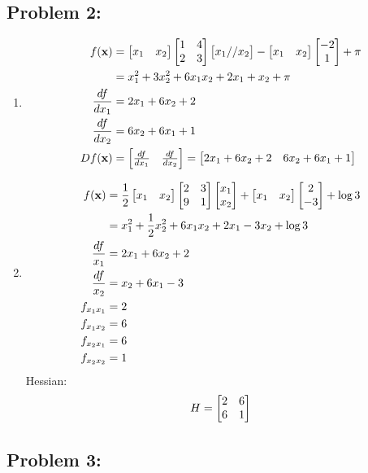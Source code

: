 \documentclass{article}
\begin{document}
\subsection*{Problem 2: } 

\begin{enumerate} 
\item  
\begin{align*}
f(\boldsymbol{\mathrm{x}})  & = \begin{bmatrix} x_1 & x_2 \end{bmatrix} \begin{bmatrix} 1 & 4 \\ 2 & 3 \end{bmatrix} \begin{bmatrix} x_1 // x_2 \end{bmatrix} - \begin{bmatrix} x_1 & x_2 \end{bmatrix} \begin{bmatrix} -2 \\ 1 \end{bmatrix} + \pi \\ 
& = x_1^2 +3 x_2^2 + 6x_1x_2 + 2x_1 + x_2 + \pi \\
\frac{df}{dx_1} &= 2x_1 + 6x_2 + 2 \\
\frac{df}{dx_2} &= 6x_2 + 6x_1 + 1 \\
Df(\boldsymbol{\mathrm{x}}) &= \begin{bmatrix} \frac{df}{dx_1} & \frac{df}{dx_2} \end{bmatrix} = \begin{bmatrix} 2x_1 + 6x_2 + 2 &   6x_2 + 6x_1 + 1 \end{bmatrix} 
\end{align*} 
\item 
\begin{align*} 
f(\boldsymbol{\mathrm{x}}) & = \frac{1}{2} \begin{bmatrix} x_1 & x_2  \end{bmatrix} \begin{bmatrix} 2 & 3 \\ 9 & 1 \end{bmatrix} \begin{bmatrix} x_1\\ x_2 \end{bmatrix} + \begin{bmatrix} x_1 & x_2 \end{bmatrix} \begin{bmatrix} 2 \\ -3  \end{bmatrix}  + \log{3}  \\
& = x_1^2 +  \frac{1}{2}x_2^2 + 6x_1x_2  + 2x_1 - 3x_2 + \log{3} \\ 
\frac{df}{x_1} & = 2x_1 + 6x_2 + 2 \\
\frac{df}{x_2} & = x_2+6x_1 - 3 \\
f_{x_1x_1} &  = 2 \\ 
f_{x_1x_2} &  = 6 \\ 
f_{x_2x_1} &  = 6 \\ 
f_{x_2x_2} &  = 1 \\ 
\end{align*}
Hessian: \\
\begin{align*} 
H = \begin{bmatrix} 2 & 6 \\ 6 & 1 \end{bmatrix} 
\end{align*} 
\end{enumerate} 


\subsection*{Problem 3: } 
\end{document}
